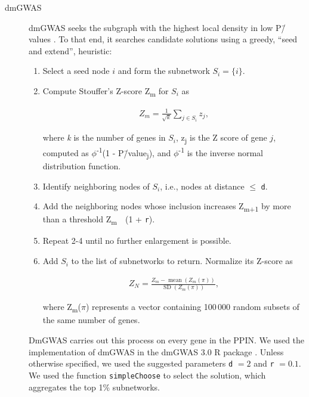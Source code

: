 \documentclass[10pt,letterpaper]{article}
\begin{document}
\begin{description}
\item[{dmGWAS}] dmGWAS seeks the subgraph with the highest local density in low P\=/values \cite{jia_dmgwas:_2011}. To that end, it searches candidate solutions using a greedy, ``seed and extend'', heuristic:

\begin{enumerate}
\item Select a seed node $i$ and form the subnetwork $S_i=\{i\}$.
\item Compute Stouffer's Z-score Z\textsubscript{m} for $S_i$ as

\begin{eqnarray} 
Z_m = \frac{1}{\sqrt{k}} \sum_{j \in S_i} z_j,
\end{eqnarray}

where \emph{k} is the number of genes in $S_i$, z\textsubscript{j} is the Z score of gene $j$, computed as \(\phi\)\textsuperscript{-1}(1 - P\=/value\textsubscript{j}), and \(\phi\)\textsuperscript{-1} is the inverse normal distribution function.
\item Identify neighboring nodes of $S_i$, i.e., nodes at distance \(\le\) \texttt{d}.
\item Add the neighboring nodes whose inclusion increases Z\textsubscript{m+1} by more than a threshold Z\textsubscript{m}~\texttimes{}~(1 + \texttt{r}).
\item Repeat 2-4 until no further enlargement is possible.
\item Add $S_i$ to the list of subnetworks to return. Normalize its Z-score as

\begin{eqnarray}
Z_{N}=\frac{Z_{m}-\operatorname{mean}\left(Z_{m}(\pi)\right)}{\operatorname{SD}\left(Z_{m}(\pi)\right)},
\end{eqnarray} 

where Z\textsubscript{m}(\(\pi\)) represents a vector containing 100\,000 random subsets of the same number of genes.
\end{enumerate}

DmGWAS carries out this process on every gene in the PPIN. We used the implementation of dmGWAS in the dmGWAS 3.0 R package \cite{dmgwas}. Unless otherwise specified, we used the suggested parameters \texttt{d} $ = 2$ and \texttt{r} $ = 0.1$. We used the function \texttt{simpleChoose} to select the solution, which aggregates the top 1\% subnetworks.


\end{description}
\end{document}
